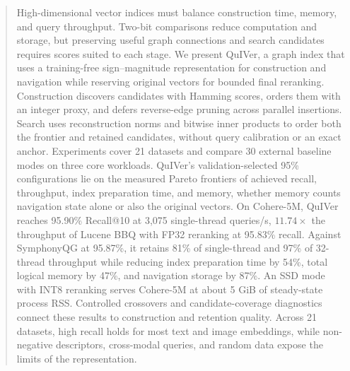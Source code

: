 \begin{abstract}
High-dimensional vector indices must balance construction time, memory, and query throughput. Two-bit comparisons reduce computation and storage, but preserving useful graph connections and search candidates requires scores suited to each stage. We present QuIVer, a graph index that uses a training-free sign--magnitude representation for construction and navigation while reserving original vectors for bounded final reranking. Construction discovers candidates with Hamming scores, orders them with an integer proxy, and defers reverse-edge pruning across parallel insertions. Search uses reconstruction norms and bitwise inner products to order both the frontier and retained candidates, without query calibration or an exact anchor. Experiments cover 21 datasets and compare 30 external baseline modes on three core workloads. QuIVer's validation-selected 95\% configurations lie on the measured Pareto frontiers of achieved recall, throughput, index preparation time, and memory, whether memory counts navigation state alone or also the original vectors. On Cohere-5M, QuIVer reaches 95.90\% Recall@10 at 3,075 single-thread queries/s, $11.74\times$ the throughput of Lucene BBQ with FP32 reranking at 95.83\% recall. Against SymphonyQG at 95.87\%, it retains 81\% of single-thread and 97\% of 32-thread throughput while reducing index preparation time by 54\%, total logical memory by 47\%, and navigation storage by 87\%. An SSD mode with INT8 reranking serves Cohere-5M at about 5 GiB of steady-state process RSS. Controlled crossovers and candidate-coverage diagnostics connect these results to construction and retention quality. Across 21 datasets, high recall holds for most text and image embeddings, while non-negative descriptors, cross-modal queries, and random data expose the limits of the representation.
\end{abstract}
